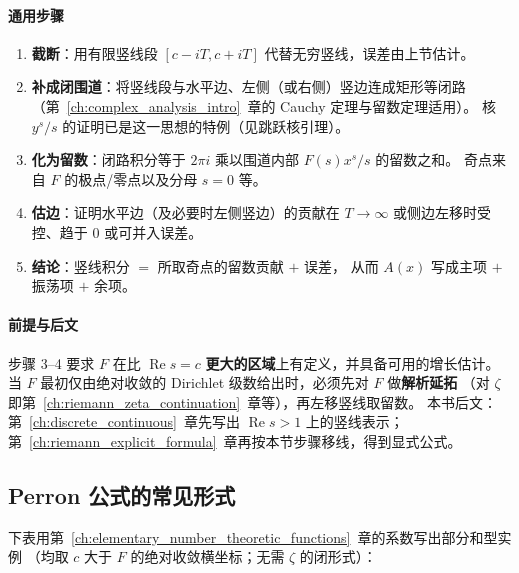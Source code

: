 \paragraph{通用步骤}
\begin{enumerate}
  \item \textbf{截断}：用有限竖线段 $[c-iT,c+iT]$ 代替无穷竖线，误差由上节估计。
  \item \textbf{补成闭围道}：将竖线段与水平边、左侧（或右侧）竖边连成矩形等闭路
        （第~\ref{ch:complex_analysis_intro}~章的 Cauchy 定理与留数定理适用）。
        核 $y^s/s$ 的证明已是这一思想的特例（见跳跃核引理）。
  \item \textbf{化为留数}：闭路积分等于 $2\pi i$ 乘以围道内部
        $F(s)x^s/s$ 的留数之和。
        奇点来自 $F$ 的极点/零点以及分母 $s=0$ 等。
  \item \textbf{估边}：证明水平边（及必要时左侧竖边）的贡献在 $T\to\infty$ 或侧边左移时受控、趋于 $0$ 或可并入误差。
  \item \textbf{结论}：竖线积分 $=$ 所取奇点的留数贡献 $+$ 误差，
        从而 $A(x)$ 写成主项 $+$ 振荡项 $+$ 余项。
\end{enumerate}

\paragraph{前提与后文}
步骤 3--4 要求 $F$ 在比 $\operatorname{Re}s=c$ \textbf{更大的区域}上有定义，并具备可用的增长估计。
当 $F$ 最初仅由绝对收敛的 Dirichlet 级数给出时，必须先对 $F$ 做\textbf{解析延拓}
（对 $\zeta$ 即第~\ref{ch:riemann_zeta_continuation}~章等），再左移竖线取留数。
本书后文：
第~\ref{ch:discrete_continuous}~章先写出 $\operatorname{Re}s>1$ 上的竖线表示；
第~\ref{ch:riemann_explicit_formula}~章再按本节步骤移线，得到显式公式。

\subsection{Perron 公式的常见形式}

下表用第~\ref{ch:elementary_number_theoretic_functions}~章的系数写出部分和型实例
（均取 $c$ 大于 $F$ 的绝对收敛横坐标；无需 $\zeta$ 的闭形式）：

